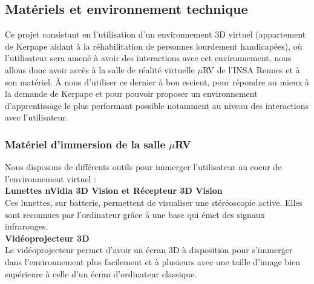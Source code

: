 \subsection{Matériels et environnement technique}

Ce projet consistant en l'utilisation d'un environnement 3D virtuel (appartement de Kerpape aidant à la réhabilitation de personnes lourdement handicapées), où l'utilisateur sera amené à avoir des interactions avec cet environnement, nous allons donc avoir accès à la salle de réalité virtuelle $\mu$RV de l'INSA Rennes et à son matériel. \`A nous d'utiliser ce dernier à bon escient, pour répondre au mieux à la demande de Kerpape et pour pouvoir proposer un environnement d'apprentissage le plus performant possible notamment au niveau des interactions avec l'utilisateur.

\subsubsection{Matériel d'immersion de la salle $\mu$RV}
Nous disposons de différents outils pour immerger l'utilisateur au coeur de l'environnement virtuel :
\\

\textbf{Lunettes nVidia 3D Vision et Récepteur 3D Vision}
\\

Ces lunettes, sur batterie, permettent de visualiser une stéréoscopie active. Elles sont reconnues par l'ordinateur grâce à une base qui émet des signaux infrarouges.
\\

\textbf{Vidéoprojecteur 3D}
\\

Le vidéoprojecteur permet d'avoir un écran 3D à disposition pour s'immerger dans l'environnement plus facilement et à plusieurs avec une taille d'image bien supérieure à celle d'un écran d'ordinateur classique.
\\


